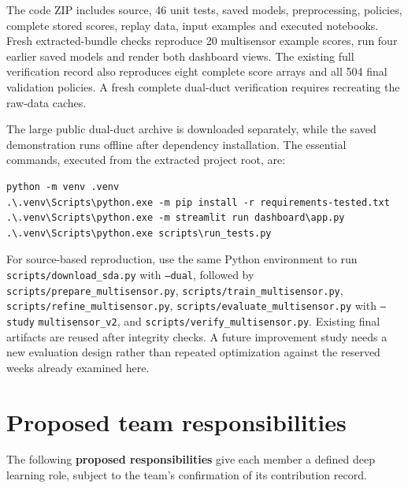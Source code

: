 The code ZIP includes source, 46 unit tests, saved models, preprocessing, policies, complete stored scores, replay data, input examples and executed notebooks. Fresh extracted-bundle checks reproduce 20 multisensor example scores, run four earlier saved models and render both dashboard views. The existing full verification record also reproduces eight complete score arrays and all 504 final validation policies. A fresh complete dual-duct verification requires recreating the raw-data caches.

The large public dual-duct archive is downloaded separately, while the saved demonstration runs offline after dependency installation. The essential commands, executed from the extracted project root, are:
\begin{lstlisting}[basicstyle=\ttfamily\small,breaklines=true]
python -m venv .venv
.\.venv\Scripts\python.exe -m pip install -r requirements-tested.txt
.\.venv\Scripts\python.exe -m streamlit run dashboard\app.py
.\.venv\Scripts\python.exe scripts\run_tests.py
\end{lstlisting}
For source-based reproduction, use the same Python environment to run \nolinkurl{scripts/download_sda.py} with \texttt{--dual}, followed by \nolinkurl{scripts/prepare_multisensor.py}, \nolinkurl{scripts/train_multisensor.py}, \nolinkurl{scripts/refine_multisensor.py}, \nolinkurl{scripts/evaluate_multisensor.py} with \texttt{--study} \nolinkurl{multisensor_v2}, and \nolinkurl{scripts/verify_multisensor.py}. Existing final artifacts are reused after integrity checks. A future improvement study needs a new evaluation design rather than repeated optimization against the reserved weeks already examined here.

\section{Proposed team responsibilities}
The following \textbf{proposed responsibilities} give each member a defined deep learning role, subject to the team's confirmation of its contribution record.


